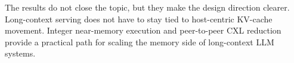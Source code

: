 The results do not close the topic, but they make the design direction clearer. Long-context serving does not have to stay tied to host-centric KV-cache movement. Integer near-memory execution and peer-to-peer CXL reduction provide a practical path for scaling the memory side of long-context LLM systems.
